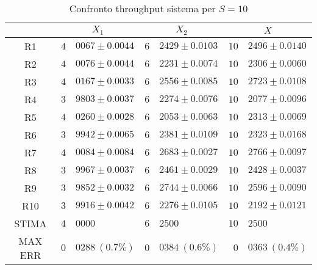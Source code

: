 \begin{table}[!h]
\begin{tabular}{c|r@{.}l|r@{.}l|r@{.}l}
& \multicolumn{2}{|c|}{$X_1$}
& \multicolumn{2}{|c|}{$X_2$}
& \multicolumn{2}{|c}{$X$} 
\\          
\hline
R1      & $4$&$0067 \pm 0.0044$ & $6$&$2429 \pm 0.0103$ & $10$&$2496 \pm 0.0140$ \\
R2      & $4$&$0076 \pm 0.0044$ & $6$&$2231 \pm 0.0074$ & $10$&$2306 \pm 0.0060$ \\
R3      & $4$&$0167 \pm 0.0033$ & $6$&$2556 \pm 0.0085$ & $10$&$2723 \pm 0.0108$ \\
R4      & $3$&$9803 \pm 0.0037$ & $6$&$2274 \pm 0.0076$ & $10$&$2077 \pm 0.0096$ \\
R5      & $4$&$0260 \pm 0.0028$ & $6$&$2053 \pm 0.0063$ & $10$&$2313 \pm 0.0069$ \\
R6      & $3$&$9942 \pm 0.0065$ & $6$&$2381 \pm 0.0109$ & $10$&$2323 \pm 0.0168$ \\
R7      & $4$&$0084 \pm 0.0084$ & $6$&$2683 \pm 0.0027$ & $10$&$2766 \pm 0.0097$ \\
R8      & $3$&$9967 \pm 0.0037$ & $6$&$2461 \pm 0.0029$ & $10$&$2428 \pm 0.0037$ \\
R9      & $3$&$9852 \pm 0.0032$ & $6$&$2744 \pm 0.0066$ & $10$&$2596 \pm 0.0090$ \\
R10     & $3$&$9916 \pm 0.0042$ & $6$&$2276 \pm 0.0105$ & $10$&$2192 \pm 0.0121$ \\
STIMA   & $4$&$0000$            & $6$&$2500$            & $10$&$2500$            \\
MAX ERR & $0$&$0288 \ (0.7\%)$  & $0$&$0384 \ (0.6\%)$  & $0$&$0363 \ (0.4\%)$     
\end{tabular}
\centering
\caption{Confronto throughput sistema per $S=10$}
\label{tab:10_x}
\end{table}
